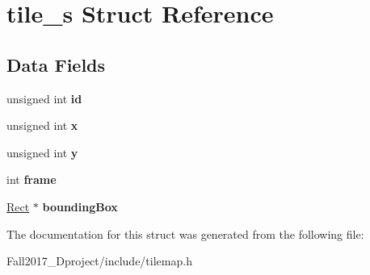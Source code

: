 \hypertarget{structtile__s}{}\section{tile\+\_\+s Struct Reference}
\label{structtile__s}
\subsection*{Data Fields}
\begin{DoxyCompactItemize}
\item 
\mbox{\label{structtile__s_ab7ce6f462afaf105224b0ca772a33c43}} 
unsigned int {\bfseries id}
\item 
\mbox{\label{structtile__s_a676e0da0ef83bbbdf42538e54b97506b}} 
unsigned int {\bfseries x}
\item 
\mbox{\label{structtile__s_ac30de26db5f6d1c18c63913729adca7d}} 
unsigned int {\bfseries y}
\item 
\mbox{\label{structtile__s_ad30f972f2e6e3e5ecab0dee38ae6cdb8}} 
int {\bfseries frame}
\item 
\mbox{\label{structtile__s_a3d49780e142d5f067cdd71be48ad284d}} 
\hyperlink{structrect__s}{Rect} $\ast$ {\bfseries bounding\+Box}
\end{DoxyCompactItemize}


The documentation for this struct was generated from the following file\+:\begin{DoxyCompactItemize}
\item 
Fall2017\+\_\+Dproject/include/tilemap.\+h\end{DoxyCompactItemize}

